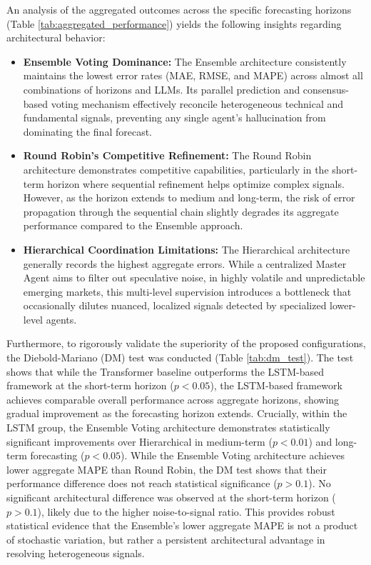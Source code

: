 \documentclass{ieeeaccess}
\begin{document}
An analysis of the aggregated outcomes across the specific forecasting horizons (Table \ref{tab:aggregated_performance}) yields the following insights regarding architectural behavior:
\begin{itemize}
    \item \textbf{Ensemble Voting Dominance:} The Ensemble architecture consistently maintains the lowest error rates (MAE, RMSE, and MAPE) across almost all combinations of horizons and LLMs. Its parallel prediction and consensus-based voting mechanism effectively reconcile heterogeneous technical and fundamental signals, preventing any single agent's hallucination from dominating the final forecast.
    \item \textbf{Round Robin's Competitive Refinement:} The Round Robin architecture demonstrates competitive capabilities, particularly in the short-term horizon where sequential refinement helps optimize complex signals. However, as the horizon extends to medium and long-term, the risk of error propagation through the sequential chain slightly degrades its aggregate performance compared to the Ensemble approach.
    \item \textbf{Hierarchical Coordination Limitations:} The Hierarchical architecture generally records the highest aggregate errors. While a centralized Master Agent aims to filter out speculative noise, in highly volatile and unpredictable emerging markets, this multi-level supervision introduces a bottleneck that occasionally dilutes nuanced, localized signals detected by specialized lower-level agents.
\end{itemize}

Furthermore, to rigorously validate the superiority of the proposed configurations, the Diebold-Mariano (DM) test was conducted (Table \ref{tab:dm_test}). The test shows that while the Transformer baseline outperforms the LSTM-based framework at the short-term horizon ($p < 0.05$), the LSTM-based framework achieves comparable overall performance across aggregate horizons, showing gradual improvement as the forecasting horizon extends. Crucially, within the LSTM group, the Ensemble Voting architecture demonstrates statistically significant improvements over Hierarchical in medium-term ($p < 0.01$) and long-term forecasting ($p < 0.05$). While the Ensemble Voting architecture achieves lower aggregate MAPE than Round Robin, the DM test shows that their performance difference does not reach statistical significance ($p > 0.1$). No significant architectural difference was observed at the short-term horizon ($p > 0.1$), likely due to the higher noise-to-signal ratio. This provides robust statistical evidence that the Ensemble's lower aggregate MAPE is not a product of stochastic variation, but rather a persistent architectural advantage in resolving heterogeneous signals.
\end{document}
